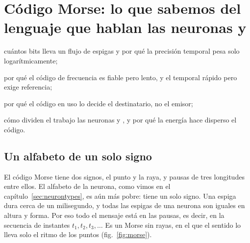 \chapter{Código Morse: lo que sabemos del lenguaje que hablan las neuronas  y }
\label{sec:code}
\begin{chaptergoals}
\item cuántos bits lleva un flujo de espigas y por qué la precisión temporal pesa solo logarítmicamente;
\item por qué el código de frecuencia es fiable pero lento, y el temporal rápido pero exige referencia;
\item por qué el código en uso lo decide el destinatario, no el emisor;
\item cómo dividen el trabajo las neuronas  y , y por qué la energía hace disperso el código.
\end{chaptergoals}

\section{Un alfabeto de un solo signo}

El código Morse tiene dos signos, el punto y la raya, y pausas de tres longitudes entre ellos. El alfabeto de la neurona, como vimos en el capítulo~\ref{sec:neurontypes}, es aún más pobre: tiene un solo signo. Una espiga dura cerca de un milisegundo, y todas las espigas de una neurona son iguales en altura y forma. Por eso todo el mensaje está en las pausas, es decir, en la secuencia de instantes $t_1,t_2,t_3,\dots$ Es un Morse sin rayas, en el que el sentido lo lleva solo el ritmo de los puntos (fig.~\ref{fig:morse}).

